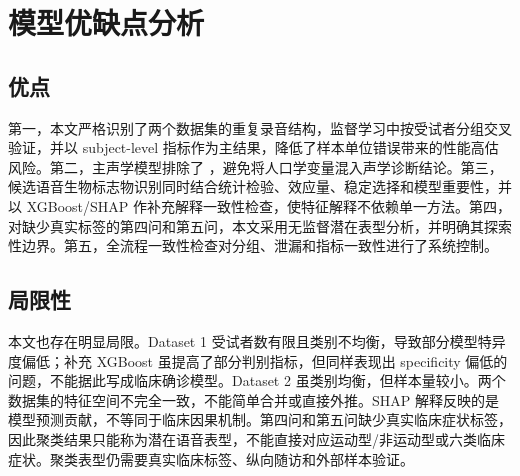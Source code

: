 \section{模型优缺点分析}

\subsection{优点}

第一，本文严格识别了两个数据集的重复录音结构，监督学习中按受试者分组交叉验证，并以 subject-level 指标作为主结果，降低了样本单位错误带来的性能高估风险。第二，主声学模型排除了 ，避免将人口学变量混入声学诊断结论。第三，候选语音生物标志物识别同时结合统计检验、效应量、稳定选择和模型重要性，并以 XGBoost/SHAP 作补充解释一致性检查，使特征解释不依赖单一方法。第四，对缺少真实标签的第四问和第五问，本文采用无监督潜在表型分析，并明确其探索性边界。第五，全流程一致性检查对分组、泄漏和指标一致性进行了系统控制。

\subsection{局限性}

本文也存在明显局限。Dataset 1 受试者数有限且类别不均衡，导致部分模型特异度偏低；补充 XGBoost 虽提高了部分判别指标，但同样表现出 specificity 偏低的问题，不能据此写成临床确诊模型。Dataset 2 虽类别均衡，但样本量较小。两个数据集的特征空间不完全一致，不能简单合并或直接外推。SHAP 解释反映的是模型预测贡献，不等同于临床因果机制。第四问和第五问缺少真实临床症状标签，因此聚类结果只能称为潜在语音表型，不能直接对应运动型/非运动型或六类临床症状。聚类表型仍需要真实临床标签、纵向随访和外部样本验证。
